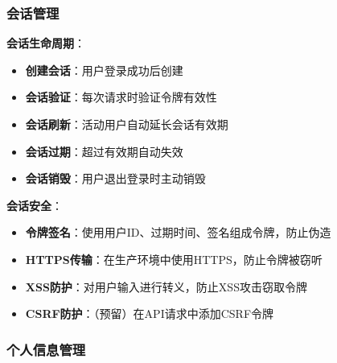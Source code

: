 \documentclass[12pt,a4paper]{article}
\begin{document}
\subsubsection{会话管理}

\textbf{会话生命周期}：
\begin{itemize}
    \item \textbf{创建会话}：用户登录成功后创建
    \item \textbf{会话验证}：每次请求时验证令牌有效性
    \item \textbf{会话刷新}：活动用户自动延长会话有效期
    \item \textbf{会话过期}：超过有效期自动失效
    \item \textbf{会话销毁}：用户退出登录时主动销毁
\end{itemize}

\textbf{会话安全}：
\begin{itemize}
    \item \textbf{令牌签名}：使用用户ID、过期时间、签名组成令牌，防止伪造
    \item \textbf{HTTPS传输}：在生产环境中使用HTTPS，防止令牌被窃听
    \item \textbf{XSS防护}：对用户输入进行转义，防止XSS攻击窃取令牌
    \item \textbf{CSRF防护}：（预留）在API请求中添加CSRF令牌
\end{itemize}

\subsubsection{个人信息管理}
\end{document}
